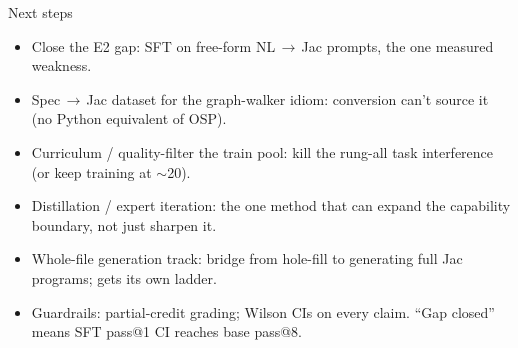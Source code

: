 \documentclass[aspectratio=169,10pt]{beamer}
\begin{document}
\begin{frame}{Next steps}
  \small
  \begin{itemize}\itemsep0.7em
    \item Close the E2 gap: SFT on free-form NL\,$\rightarrow$\,Jac prompts, the one measured weakness.
    \item Spec\,$\rightarrow$\,Jac dataset for the graph-walker idiom: conversion can't source it (no Python equivalent of OSP).
    \item Curriculum / quality-filter the train pool: kill the rung-all task interference (or keep training at $\sim$20).
    \item Distillation / expert iteration: the one method that can expand the capability boundary, not just sharpen it.
    \item Whole-file generation track: bridge from hole-fill to generating full Jac programs; gets its own ladder.
    \item Guardrails: partial-credit grading; Wilson CIs on every claim. ``Gap closed'' means SFT pass@1 CI reaches base pass@8.
  \end{itemize}
\end{frame}
\end{document}
